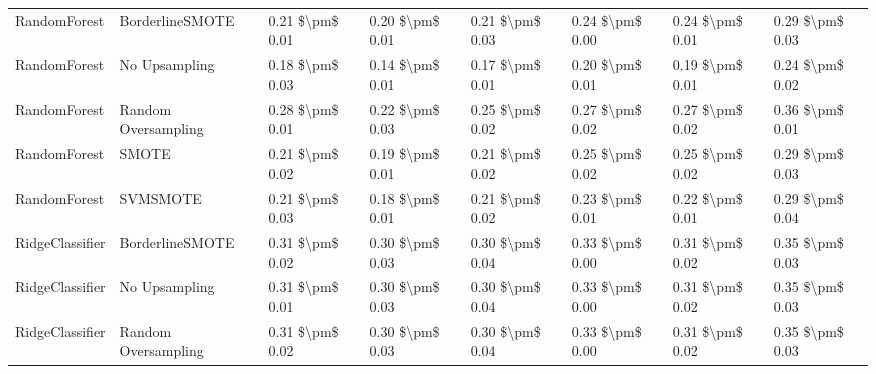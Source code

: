 \begin{tabular}{llllllll}
                   RandomForest &               BorderlineSMOTE & 0.21 \$\textbackslash pm\$ 0.01 &           0.20 \$\textbackslash pm\$ 0.01 &       0.21 \$\textbackslash pm\$ 0.03 &        0.24 \$\textbackslash pm\$ 0.00 &                         0.24 \$\textbackslash pm\$ 0.01 &     0.29 \$\textbackslash pm\$ 0.03 \\
                   RandomForest &                 No Upsampling & 0.18 \$\textbackslash pm\$ 0.03 &           0.14 \$\textbackslash pm\$ 0.01 &       0.17 \$\textbackslash pm\$ 0.01 &        0.20 \$\textbackslash pm\$ 0.01 &                         0.19 \$\textbackslash pm\$ 0.01 &     0.24 \$\textbackslash pm\$ 0.02 \\
                   RandomForest &           Random Oversampling & 0.28 \$\textbackslash pm\$ 0.01 &           0.22 \$\textbackslash pm\$ 0.03 &       0.25 \$\textbackslash pm\$ 0.02 &        0.27 \$\textbackslash pm\$ 0.02 &                         0.27 \$\textbackslash pm\$ 0.02 &     0.36 \$\textbackslash pm\$ 0.01 \\
                   RandomForest &                         SMOTE & 0.21 \$\textbackslash pm\$ 0.02 &           0.19 \$\textbackslash pm\$ 0.01 &       0.21 \$\textbackslash pm\$ 0.02 &        0.25 \$\textbackslash pm\$ 0.02 &                         0.25 \$\textbackslash pm\$ 0.02 &     0.29 \$\textbackslash pm\$ 0.03 \\
                   RandomForest &                      SVMSMOTE & 0.21 \$\textbackslash pm\$ 0.03 &           0.18 \$\textbackslash pm\$ 0.01 &       0.21 \$\textbackslash pm\$ 0.02 &        0.23 \$\textbackslash pm\$ 0.01 &                         0.22 \$\textbackslash pm\$ 0.01 &     0.29 \$\textbackslash pm\$ 0.04 \\
                RidgeClassifier &               BorderlineSMOTE & 0.31 \$\textbackslash pm\$ 0.02 &           0.30 \$\textbackslash pm\$ 0.03 &       0.30 \$\textbackslash pm\$ 0.04 &        0.33 \$\textbackslash pm\$ 0.00 &                         0.31 \$\textbackslash pm\$ 0.02 &     0.35 \$\textbackslash pm\$ 0.03 \\
                RidgeClassifier &                 No Upsampling & 0.31 \$\textbackslash pm\$ 0.01 &           0.30 \$\textbackslash pm\$ 0.03 &       0.30 \$\textbackslash pm\$ 0.04 &        0.33 \$\textbackslash pm\$ 0.00 &                         0.31 \$\textbackslash pm\$ 0.02 &     0.35 \$\textbackslash pm\$ 0.03 \\
                RidgeClassifier &           Random Oversampling & 0.31 \$\textbackslash pm\$ 0.02 &           0.30 \$\textbackslash pm\$ 0.03 &       0.30 \$\textbackslash pm\$ 0.04 &        0.33 \$\textbackslash pm\$ 0.00 &                         0.31 \$\textbackslash pm\$ 0.02 &     0.35 \$\textbackslash pm\$ 0.03 \\

\end{tabular}
